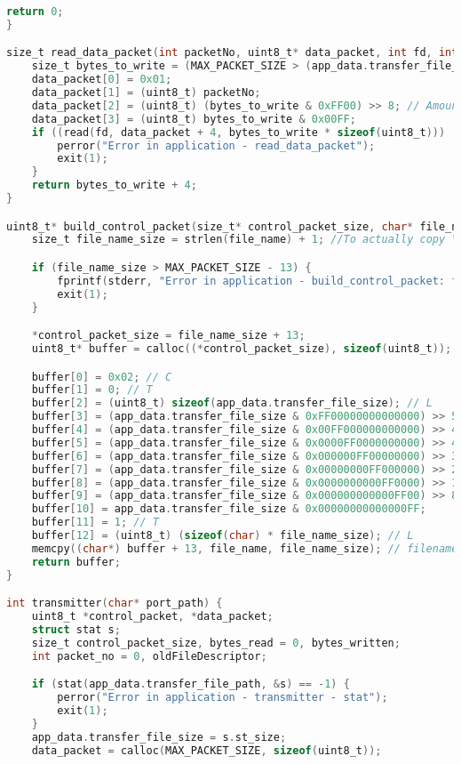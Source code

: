 \begin{lstlisting}[language=C, caption=application.c]
    return 0;
}

size_t read_data_packet(int packetNo, uint8_t* data_packet, int fd, int bytes_read) {
    size_t bytes_to_write = (MAX_PACKET_SIZE > (app_data.transfer_file_size - bytes_read + 4)) ? (app_data.transfer_file_size - bytes_read) : MAX_PACKET_SIZE - 4; // In case of the file being in its end
    data_packet[0] = 0x01;
    data_packet[1] = (uint8_t) packetNo;
    data_packet[2] = (uint8_t) (bytes_to_write & 0xFF00) >> 8; // Amount of data
    data_packet[3] = (uint8_t) bytes_to_write & 0x00FF;
    if ((read(fd, data_packet + 4, bytes_to_write * sizeof(uint8_t))) != bytes_to_write) {
        perror("Error in application - read_data_packet");
        exit(1);
    }
    return bytes_to_write + 4;
}

uint8_t* build_control_packet(size_t* control_packet_size, char* file_name) {
    size_t file_name_size = strlen(file_name) + 1; //To actually copy \0

    if (file_name_size > MAX_PACKET_SIZE - 13) {
        fprintf(stderr, "Error in application - build_control_packet: filename too big\n");
        exit(1);
    }

    *control_packet_size = file_name_size + 13;
    uint8_t* buffer = calloc((*control_packet_size), sizeof(uint8_t));

    buffer[0] = 0x02; // C
    buffer[1] = 0; // T
    buffer[2] = (uint8_t) sizeof(app_data.transfer_file_size); // L
    buffer[3] = (app_data.transfer_file_size & 0xFF00000000000000) >> 56; // filesize
    buffer[4] = (app_data.transfer_file_size & 0x00FF000000000000) >> 48;
    buffer[5] = (app_data.transfer_file_size & 0x0000FF0000000000) >> 40;
    buffer[6] = (app_data.transfer_file_size & 0x000000FF00000000) >> 32;
    buffer[7] = (app_data.transfer_file_size & 0x00000000FF000000) >> 24;
    buffer[8] = (app_data.transfer_file_size & 0x0000000000FF0000) >> 16;
    buffer[9] = (app_data.transfer_file_size & 0x000000000000FF00) >> 8;
    buffer[10] = app_data.transfer_file_size & 0x00000000000000FF;
    buffer[11] = 1; // T
    buffer[12] = (uint8_t) (sizeof(char) * file_name_size); // L
    memcpy((char*) buffer + 13, file_name, file_name_size); // filename
    return buffer;
}

int transmitter(char* port_path) {
    uint8_t *control_packet, *data_packet;
    struct stat s;
    size_t control_packet_size, bytes_read = 0, bytes_written;
    int packet_no = 0, oldFileDescriptor;

    if (stat(app_data.transfer_file_path, &s) == -1) {
        perror("Error in application - transmitter - stat");
        exit(1);
    }
    app_data.transfer_file_size = s.st_size;
    data_packet = calloc(MAX_PACKET_SIZE, sizeof(uint8_t));


\end{lstlisting}
